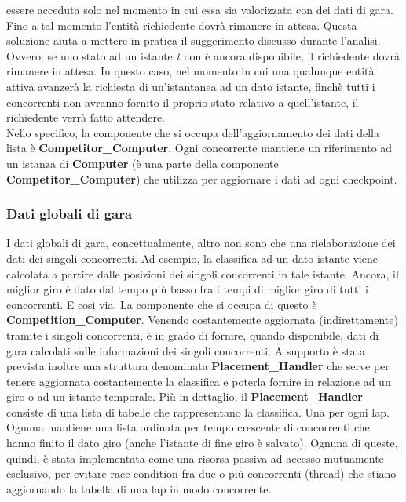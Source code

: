      essere acceduta solo nel momento in cui essa sia valorizzata con dei dati di gara. Fino a tal momento l'entità richiedente dovrà rimanere
     in attesa. Questa soluzione aiuta a mettere in pratica il suggerimento discusso durante l'analisi. Ovvero: se uno stato ad un istante
     \emph{t} non è ancora disponibile, il richiedente dovrà rimanere in attesa. In questo caso, nel momento in cui una qualunque entità attiva
     avanzerà la richiesta di un'istantanea ad un dato istante, finchè tutti i concorrenti non avranno fornito il proprio stato relativo 
     a quell'istante, il richiedente verrà fatto attendere.\\
     Nello specifico, la componente che si occupa dell'aggiornamento dei dati della lista è \textbf{Competitor\_Computer}. Ogni concorrente
     mantiene un riferimento ad un istanza di \textbf{Computer} (è una parte della componente \textbf{Competitor\_Computer}) 
     che utilizza per aggiornare i dati ad ogni checkpoint.
     \subsubsection{Dati globali di gara}
     \label{dati_globali}
     I dati globali di gara, concettualmente, altro non sono che una rielaborazione dei dati dei singoli concorrenti. Ad esempio, la classifica
     ad un dato istante viene calcolata a partire dalle posizioni dei singoli concorrenti in tale istante. Ancora, il miglior giro è dato dal
     tempo più basso fra i tempi di miglior giro di tutti i concorrenti. E così via. La componente che si occupa di questo è \textbf{Competition\_Computer}.
     Venendo costantemente aggiornata (indirettamente) tramite i singoli concorrenti, è in grado di fornire, quando disponibile, dati di gara
     calcolati sulle informazioni dei singoli concorrenti. A supporto è stata prevista inoltre una struttura denominata \textbf{Placement\_Handler}
     che serve per tenere aggiornata costantemente la classifica e poterla fornire in relazione ad un giro o ad un istante temporale.
     Più in dettaglio, il \textbf{Placement\_Handler} consiste di una lista di tabelle che rappresentano la classifica. Una per ogni lap.
     Ognuna mantiene una lista ordinata per tempo crescente di concorrenti che hanno finito il dato giro (anche l'istante di fine giro è
     salvato).
     Ognuna di queste, quindi, è stata implementata come una risorsa passiva ad accesso mutuamente esclusivo, 
     per evitare race condition fra due o più concorrenti (thread) che stiano aggiornando la tabella di una lap in modo concorrente.
